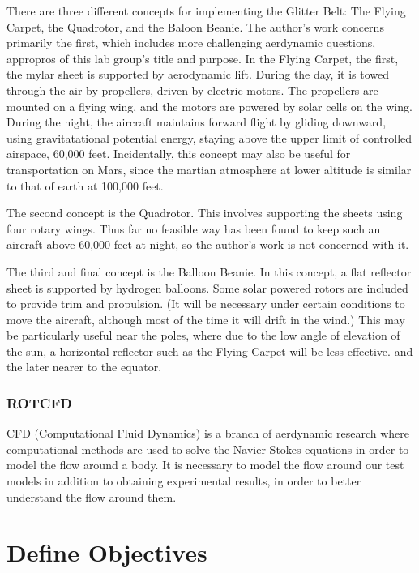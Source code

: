 \documentclass[12pt]{report} %
\begin{document}
There are three different concepts for implementing the Glitter Belt: The Flying Carpet, the Quadrotor, and the Baloon Beanie.  The
author's work concerns primarily the first, which includes more challenging aerdynamic questions,
appropros of this lab group's title and purpose.  In the Flying Carpet,
the first, the mylar sheet is supported by aerodynamic lift.  During the day, it is towed through the air by propellers, driven
by electric motors.  The propellers are mounted on a flying wing, and the motors are powered by solar cells on the wing.  During the
night, the aircraft maintains forward flight by gliding downward, using gravitatational potential energy, staying above the upper limit
of controlled airspace, 60,000 feet.  Incidentally, this concept may also be useful for transportation on Mars, since the martian atmosphere
at lower altitude is similar to that of earth at 100,000 feet.

The second concept is the Quadrotor.  This involves supporting the sheets using four rotary wings.  Thus far no feasible way has been
found to keep such an aircraft above 60,000 feet at night, so the author's work is not concerned with it.

The third and final concept is the Balloon Beanie.  In this concept, a flat reflector sheet is supported by hydrogen balloons.  Some
solar powered rotors are included to provide trim and propulsion. (It will be necessary under certain conditions to move the aircraft,
although most of the time it will drift in the wind.)  This may be particularly useful near the poles, where due to the low angle of
elevation of the sun, a horizontal reflector such as the Flying Carpet will be less effective.
and the later nearer to the equator.

\subsection{ROTCFD}

CFD (Computational Fluid Dynamics) is a branch of aerdynamic research where computational methods are used to solve the Navier-Stokes
equations in order to model the flow around a body.  It is necessary to model the flow around our test models in addition to obtaining
experimental results, in order to better understand the flow around them.

\chapter{Define Objectives}
 
\end{document}
